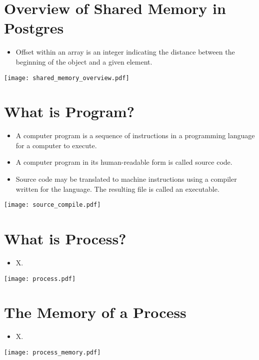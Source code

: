 \documentclass[en,hazy,blue,screen,14pt]{elegantnote}
\begin{document}
\newpage
\section{Overview of Shared Memory in Postgres}
\begin{itemize}
	\item Offset within an array is an integer indicating the distance between the beginning of the object and a given element.
\end{itemize}
\centerline{\texttt{[image: shared\_memory\_overview.pdf]}}

\newpage
\section{What is Program?}
\begin{itemize}
	\item A computer program is a sequence of instructions in a programming language for a computer to execute.
	\item A computer program in its human-readable form is called source code. 
	\item Source code may be translated to machine instructions using a compiler written for the language. The resulting file is called an executable.
\end{itemize}

\centerline{\texttt{[image: source\_compile.pdf]}}

\newpage
\section{What is Process?}
\begin{itemize}
	\item X.
\end{itemize}
\centerline{\texttt{[image: process.pdf]}}

\newpage
\section{The Memory of a Process}
\begin{itemize}
	\item X.
\end{itemize}
\centerline{\texttt{[image: process\_memory.pdf]}}
\end{document}
